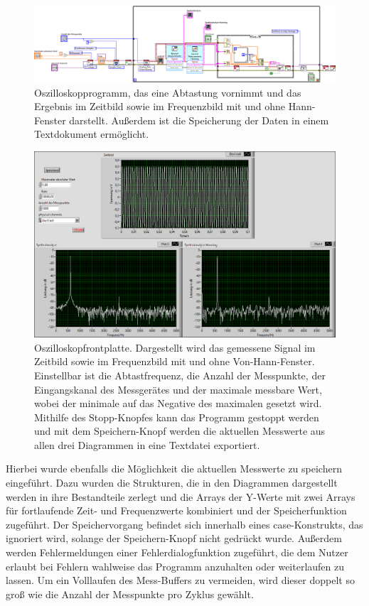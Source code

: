 \documentclass[
a4paper,
12pt,
pagesize,
ngerman
]{scrartcl}
\begin{document}
	\begin{figure}[H]  
		\includegraphics[width=1\textwidth]{EIRE2018Dateien/Tag3/ManuellVId}
		\centering
		\caption{
			Oszilloskopprogramm, das eine Abtastung vornimmt und das Ergebnis im Zeitbild sowie im Frequenzbild mit und ohne Hann-Fenster darstellt.
			Außerdem ist die Speicherung der Daten in einem Textdokument ermöglicht.
		}
		\label{fig_tag23_oszi_manuell_block}
		\centering
	\end{figure}

	\begin{figure}[H]  
		\includegraphics[width=1\textwidth]{EIRE2018Dateien/Tag3/ManuellVIp}
		\centering
		\caption{
			Oszilloskopfrontplatte. Dargestellt wird das gemessene Signal im Zeitbild sowie im Frequenzbild mit und ohne Von-Hann-Fenster. Einstellbar ist die Abtastfrequenz, die Anzahl der Messpunkte, der Eingangskanal des Messgerätes und der maximale messbare Wert, wobei der minimale auf das Negative des maximalen gesetzt wird.
			Mithilfe des Stopp-Knopfes kann das Programm gestoppt werden und mit dem Speichern-Knopf werden die aktuellen Messwerte aus allen drei Diagrammen in eine Textdatei exportiert.
		}
		\label{fig_tag23_oszi_manuell_front}
		\centering
	\end{figure}

	Hierbei wurde ebenfalls die Möglichkeit die aktuellen Messwerte zu speichern eingeführt.
	Dazu wurden die Strukturen, die in den Diagrammen dargestellt werden in ihre Bestandteile zerlegt und die Arrays der Y-Werte mit zwei Arrays für fortlaufende Zeit- und Frequenzwerte kombiniert und der Speicherfunktion zugeführt.
	Der Speichervorgang befindet sich innerhalb eines case-Konstrukts, das ignoriert wird, solange der Speichern-Knopf nicht gedrückt wurde.
	Außerdem werden Fehlermeldungen einer Fehlerdialogfunktion zugeführt, die dem Nutzer erlaubt bei Fehlern wahlweise das Programm anzuhalten oder weiterlaufen zu lassen.
	Um ein Volllaufen des Mess-Buffers zu vermeiden, wird dieser doppelt so groß wie die Anzahl der Messpunkte pro Zyklus gewählt.
	
\end{document}

